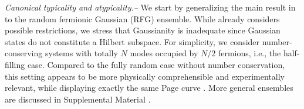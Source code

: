 \documentclass[twocolumn,english,prl,aps,superscriptaddress,amsmath,amssymb,floatfix]{revtex4-2}
\begin{document}
\begin{comment}
The Page curve for RFG-ensemble was first obtained in \citep{Bianchi2021a}
and later generalized to charge conserved symmetric case in \citep{Bianchi2021}.
It still has volume law but with a different factor and variance from
\textcolor{red}{the interacting} %
one. Besides, this random quantum resource has many applications
in quantum information process \citep{Circuit_complexity_free_fermion,fermionicTomograph1}
and may also have advantage in quantum metrology when generalizing
\citep{Bosonic_metrology} to fermionic system \citep{fermionic_Gauss_metrology}.
Therefore, for those practical reasons we need to consider how the
Page curve can appear in real physical system rather than the manifold
of random matrices\citep{Kaneko2020,Nakata2017,Ho2022,Lucas2022}.

In this letter, we first derive the canonical typicality of RFG-ensemble. We will use our typicality result to illustrate the difference of Page
curve between free and \textcolor{red}{interacting} %
fermionic system. Then, we propose
a simple class of time-independent Hamiltonian with translational
symmetry, which can dynamically emerge the Page curve for RFG-ensemble
to a very high accuracy. Some of those previous works \citep{Kaneko2020,Nakata2017,Ho2022,Lucas2022}
consider non-integrable systems or floquet systems which are hard
to keep track of analytically and only have numerical results. Others
require local physical systems plus infinite degrees of ancilla. Our
proposal is much simpler than those. It has no reference to ancilla
and is a pure global property.    

\end{comment}
\emph{Canonical typicality and atypicality.--}%
We start by generalizing %
the main result in \citep{Popescu2006} to the random fermionic Gaussian (RFG) ensemble. While \citep{Popescu2006} already considers possible restrictions, we stress that Gaussianity is inadequate since Gaussian states do not constitute a Hilbert subspace. 
For simplicity, we %
consider number-conserving systems with totally $N$ modes occupied by $N/2$ fermions, i.e., the half-filling case. Compared to the fully random case without number conservation, this setting appears to be more physically comprehensible and experimentally relevant, while displaying exactly the same Page curve %
\citep{Bianchi2021a,Bianchi2021}. %
More general ensembles are discussed %
in Supplemental Material \cite{SM}. 
\end{document}
